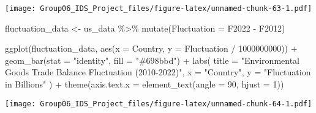 \documentclass[
]{article}
\newenvironment{Shaded}{\begin{snugshade}}{\end{snugshade}}
\newcommand{\AttributeTok}[1]{\textcolor[rgb]{0.77,0.63,0.00}{#1}}
\newcommand{\DecValTok}[1]{\textcolor[rgb]{0.00,0.00,0.81}{#1}}
\newcommand{\FunctionTok}[1]{\textcolor[rgb]{0.00,0.00,0.00}{#1}}
\newcommand{\NormalTok}[1]{#1}
\newcommand{\OtherTok}[1]{\textcolor[rgb]{0.56,0.35,0.01}{#1}}
\newcommand{\SpecialCharTok}[1]{\textcolor[rgb]{0.00,0.00,0.00}{#1}}
\newcommand{\StringTok}[1]{\textcolor[rgb]{0.31,0.60,0.02}{#1}}
\begin{document}
\texttt{[image: Group06\_IDS\_Project\_files/figure-latex/unnamed-chunk-63-1.pdf]}

\begin{Shaded}
\begin{Highlighting}[]
\NormalTok{fluctuation\_data }\OtherTok{\textless{}{-}}\NormalTok{ us\_data }\SpecialCharTok{\%\textgreater{}\%}
  \FunctionTok{mutate}\NormalTok{(}\AttributeTok{Fluctuation =}\NormalTok{ F2022 }\SpecialCharTok{{-}}\NormalTok{ F2012)}

\FunctionTok{ggplot}\NormalTok{(fluctuation\_data, }\FunctionTok{aes}\NormalTok{(}\AttributeTok{x =}\NormalTok{ Country, }\AttributeTok{y =}\NormalTok{ Fluctuation }\SpecialCharTok{/} \DecValTok{1000000000}\NormalTok{)) }\SpecialCharTok{+}
  \FunctionTok{geom\_bar}\NormalTok{(}\AttributeTok{stat =} \StringTok{"identity"}\NormalTok{, }\AttributeTok{fill =} \StringTok{"\#698bbd"}\NormalTok{) }\SpecialCharTok{+}
  \FunctionTok{labs}\NormalTok{(}
    \AttributeTok{title =} \StringTok{"Environmental Goods Trade Balance Fluctuation (2010{-}2022)"}\NormalTok{,}
    \AttributeTok{x =} \StringTok{"Country"}\NormalTok{,}
    \AttributeTok{y =} \StringTok{"Fluctuation in Billions"}
\NormalTok{  ) }\SpecialCharTok{+}
  \FunctionTok{theme}\NormalTok{(}\AttributeTok{axis.text.x =} \FunctionTok{element\_text}\NormalTok{(}\AttributeTok{angle =} \DecValTok{90}\NormalTok{, }\AttributeTok{hjust =} \DecValTok{1}\NormalTok{))}
\end{Highlighting}
\end{Shaded}

\texttt{[image: Group06\_IDS\_Project\_files/figure-latex/unnamed-chunk-64-1.pdf]}

\begin{Shaded}
\end{Shaded}
\end{document}
